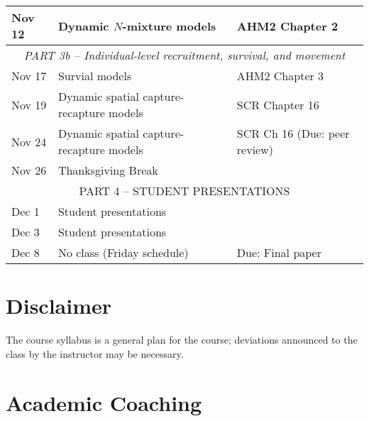 \documentclass[12pt]{article}
\begin{document}
\begin{center}
\begin{tabular}[c]{lll}
Nov 12     & Dynamic $N$-mixture models                   & AHM2 Chapter 2                            \\
\hline
           \multicolumn{3}{c}{\it PART 3b -- Individual-level recruitment, survival, and movement}    \\
\hline
Nov 17     & Survial models                               & AHM2 Chapter 3                            \\
Nov 19     & Dynamic spatial capture-recapture models     & SCR Chapter 16                            \\
\hline
Nov 24     & Dynamic spatial capture-recapture models     & SCR Ch 16 (Due: peer review)              \\
Nov 26     & Thanksgiving Break                           &                                           \\
\hline
           \multicolumn{3}{c}{PART 4 -- STUDENT PRESENTATIONS}                                        \\
\hline
Dec 1      & Student presentations                        &                                           \\
Dec 3      & Student presentations                        &                                           \\
\hline
Dec 8      & No class (Friday schedule)                   & Due: Final paper                          \\
\hline \hline
\end{tabular}
\end{center}


\clearpage


\vspace{-2mm}
\section*{\normalsize Disclaimer}
\vspace{-4mm}

The course syllabus is a general plan for the course; deviations
announced to the class by the instructor may be necessary. 


\vspace{-2mm}
\section*{\normalsize Academic Coaching}
\vspace{-4mm}
\end{document}
